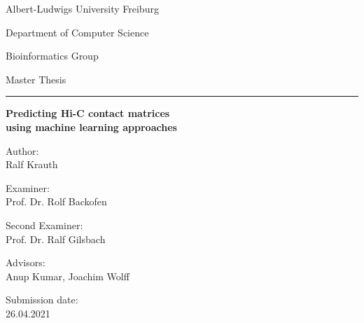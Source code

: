 %
\begin{titlepage}
 \centering
 Albert-Ludwigs University Freiburg
 
 Department of Computer Science
 
 Bioinformatics Group
 \vspace{4cm}
 
  Master Thesis
 \vspace{3mm} 
  
 \huge \hrule \vspace{5mm}
 \textbf{Predicting Hi-C contact matrices \\ using machine learning approaches}
 
 \hrulefill
 
 \vfill
 \raggedright
 \normalsize
  Author:\\
  Ralf Krauth 
  
  Examiner:\\
  Prof. Dr. Rolf Backofen
  
  Second Examiner:\\
  Prof. Dr. Ralf Gilsbach
  
  Advisors:\\
  Anup Kumar, Joachim Wolff
  
  Submission date:\\
  26.04.2021

\end{titlepage}
